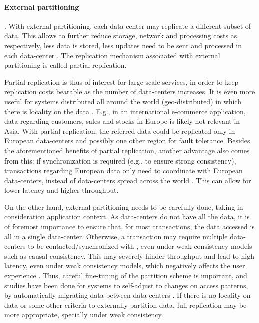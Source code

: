 \paragraph{External partitioning}.
With external partitioning, each data-center may replicate a different subset of data.
This allows to further reduce storage, network and processing costs as, respectively, less data is stored, less updates need to be sent and processed in each data-center \cite{spanner, sipre}.
The replication mechanism associated with external partitioning is called partial replication.

Partial replication is thus of interest for large-scale services, in order to keep replication costs bearable as the number of data-centers increases.
It is even more useful for systems distributed all around the world (geo-distributed) in which there is locality on the data \cite{sipre, slog}.
E.g., in an international e-commerce application, data regarding customers, sales and stocks in Europe is likely not relevant in Asia.
With partial replication, the referred data could be replicated only in European data-centers and possibly one other region for fault tolerance.
Besides the aforementioned benefits of partial replication, another advantage also comes from this: if synchronization is required (e.g., to ensure strong consistency), transactions regarding European data only need to coordinate with European data-centers, instead of data-centers spread across the world \cite{spanner, sipre, slog}.
This can allow for lower latency and higher throughput.

On the other hand, external partitioning needs to be carefully done, taking in consideration application context.
As data-centers do not have all the data, it is of foremost importance to ensure that, for most transactions, the data accessed is all in a single data-center.
Otherwise, a transaction may require multiple data-centers to be contacted/synchronized with \cite{spanner, sipre, chronocache, slog}, even under weak consistency models such as causal consistency.
This may severely hinder throughput and lead to high latency, even under weak consistency models, which negatively affects the user experience \cite{eiger, mdcc}.
Thus, careful fine-tuning of the partition scheme is important, and studies have been done for systems to self-adjust to changes on access patterns, by automatically migrating data between data-centers \cite{slog}.
If there is no locality on data or some other criteria to externally partition data, full replication may be more appropriate, specially under weak consistency.

